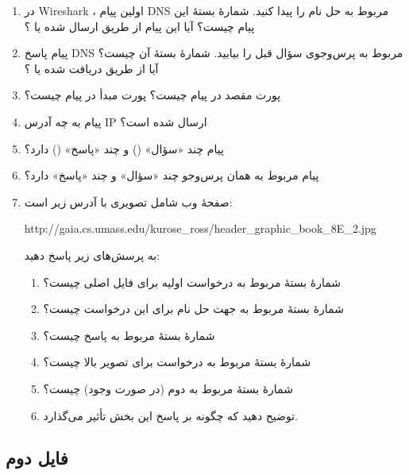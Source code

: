 \begin{enumerate}

	\item
	در Wireshark ، اولین پیام DNS مربوط به حل نام  را پیدا کنید.
	شمارهٔ بستهٔ این پیام چیست؟ 
	آیا این پیام از طریق  ارسال شده یا ؟
	
	\item
	پیام پاسخ DNS مربوط به پرس‌وجوی سؤال قبل را بیابید. 
	شمارهٔ بستهٔ آن چیست؟ 
	آیا از طریق  دریافت شده یا ؟
	
	\item
	پورت مقصد در پیام  چیست؟ 
	پورت مبدأ در پیام  چیست؟
	
	\item
	پیام  به چه آدرس IP ارسال شده است؟
	
	\item
	پیام  چند «سؤال» () و چند «پاسخ» () دارد؟
	
	\item
	پیام  مربوط به همان پرس‌وجو چند «سؤال» و چند «پاسخ» دارد؟
	
	\item
	صفحهٔ وب
	شامل تصویری با آدرس زیر است:
	\begin{latin}
		http://gaia.cs.umass.edu/kurose\_ross/header\_graphic\_book\_8E\_2.jpg
	\end{latin}
	به پرسش‌های زیر پاسخ دهید:
	\begin{enumerate}
		\item شمارهٔ بستهٔ مربوط به درخواست  اولیه برای فایل اصلی چیست؟
		\item شمارهٔ بستهٔ مربوط به  جهت حل نام  برای این درخواست چیست؟
		\item شمارهٔ بستهٔ مربوط به پاسخ  چیست؟
		\item شمارهٔ بستهٔ مربوط به درخواست  برای تصویر بالا چیست؟
		\item شمارهٔ بستهٔ مربوط به  دوم (در صورت وجود) چیست؟
		\item توضیح دهید که  چگونه بر پاسخ این بخش تأثیر می‌گذارد.
	\end{enumerate}
	
	
\end{enumerate}

\subsection*{فایل دوم}

